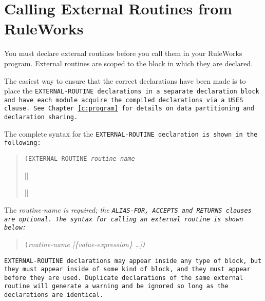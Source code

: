 \section{Calling External Routines from RuleWorks}

You must declare external routines before you call them in your
RuleWorks program.  External routines are scoped to the block in which
they are declared.

The easiest way to ensure that the correct declarations have been made
is to place the \tt{EXTERNAL-ROUTINE} declarations in a separate
declaration block and have each module acquire the compiled
declarations via a \tt{USES} clause. See Chapter~\ref{c:program} for
details on data partitioning and declaration sharing.

The complete syntax for the \tt{EXTERNAL-ROUTINE} declaration is shown
in the following:

\begin{quote}
\tt{(EXTERNAL-ROUTINE} \it{routine-name}\par
{}\par
\qquad\qquad[\verb|<|\it{formal-parameter-name}\verb|>| [\tt[\it{size}\tt]]]\par
{}\par
\qquad{}\par
\qquad\qquad[\verb|<|\it{formal-parameter-name}\verb|>| [\tt[\it{size}\tt]]]\par
{}\par
\qquad{}\par
\end{quote}

The \it{routine-name} is required; the \tt{ALIAS-FOR}, \tt{ACCEPTS}
and \tt{RETURNS} clauses are optional.  The syntax for calling an
external routine is shown below:

\begin{quote}
\verb|(|\it{routine-name} [\{\it{value-expression}\} \ldots]\verb|)|
\end{quote}

\tt{EXTERNAL-ROUTINE} declarations may appear inside any type of block, but
they must appear inside of some kind of block, and they must appear
before they are used. Duplicate declarations of the same external
routine will generate a warning and be ignored so long as the
declarations are identical.

